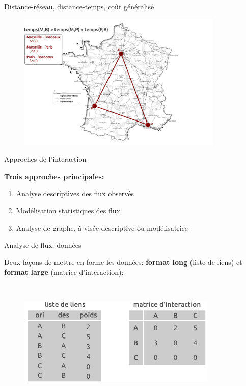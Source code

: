 \begin{frame}{Distance-réseau, distance-temps, coût généralisé}

\begin{figure}
  \includegraphics[width=9.8cm]{DistancesTemps.pdf}
\end{figure}

\end{frame}




\begin{frame}{Approches de l'interaction}

\textbf{Trois approches principales:}

\begin{enumerate}
  \item Analyse descriptives des flux observés
  \item Modélisation statistiques des flux
  \item Analyse de graphe, à visée descriptive ou modélisatrice
\end{enumerate}

\end{frame}




\begin{frame}{Analyse de flux: données}

Deux façons de mettre en forme les données: \textbf{format long} (liste de liens) et \textbf{format large} (matrice d'interaction):

~

\begin{figure}
  \includegraphics[width=9.5cm]{MatriceOD.pdf}
\end{figure}

\end{frame}


